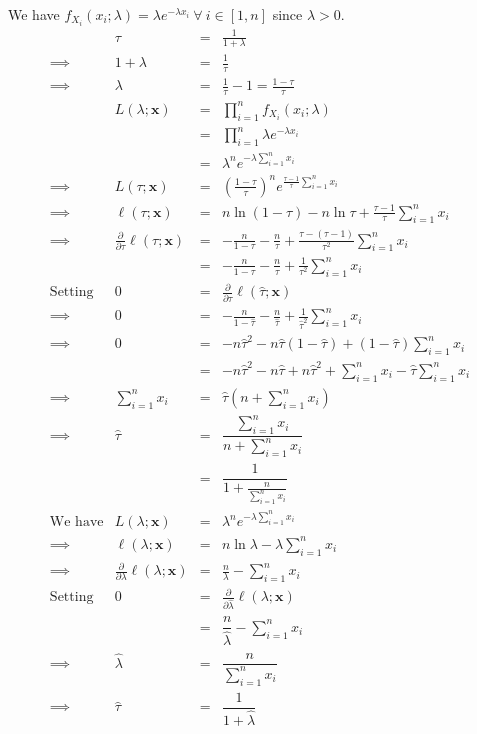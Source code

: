 \documentclass[11pt,a4paper]{article}
\begin{document}
\apart
We have $f_{X_i}(x_i;\lambda)=\lambda e^{-\lambda x_i}\ \forall\ i\in[1,n]$ since $\lambda>0$.
\[\begin{array}{rrcl}
&\tau&=&\frac{1}{1+\lambda}\\
\implies&1+\lambda&=&\frac{1}{\tau}\\
\implies&\lambda&=&\frac{1}{\tau}-1=\frac{1-\tau}{\tau}\\
&L(\lambda;\textbf{x})&=&\prod\limits_{i=1}^nf_{X_i}(x_i;\lambda)\\
&&=&\prod\limits_{i=1}^n\lambda e^{-\lambda x_i}\\
&&=&\lambda^ne^{-\lambda\sum_{i=1}^nx_i}\\
\implies&L(\tau;\textbf{x})&=&\left(\frac{1-\tau}{\tau}\right)^ne^{\frac{\tau-1}{\tau}\sum_{i=1}^nx_i}\\
\implies&\ell(\tau;\textbf{x})&=&n\ln(1-\tau)-n\ln\tau+\frac{\tau-1}{\tau}\sum\limits_{i=1}^nx_i\\
\implies&\frac{\partial}{\partial\tau}\ell(\tau;\textbf{x})&=&-\frac{n}{1-\tau}-\frac{n}{\tau}+\frac{\tau-(\tau-1)}{\tau^2}\sum\limits_{i=1}^nx_i\\
&&=&-\frac{n}{1-\tau}-\frac{n}{\tau}+\frac{1}{\tau^2}\sum\limits_{i=1}^nx_i\\
\text{Setting}&0&=&\frac{\partial}{\partial\tau}\ell(\hat{\tau};\textbf{x})\\
\implies&0&=&-\frac{n}{1-\hat{\tau}}-\frac{n}{\hat{\tau}}+\frac{1}{\hat{\tau}^2}\sum\limits_{i=1}^nx_i\\
\implies&0&=&-n\hat{\tau}^2-n\hat{\tau}(1-\hat{\tau})+(1-\hat{\tau})\sum\limits_{i=1}^nx_i\\
&&=&-n\hat{\tau}^2-n\hat{\tau}+n\hat{\tau}^2+\sum\limits_{i=1}^nx_i-\hat{\tau}\sum\limits_{i=1}^nx_i\\
\implies&\sum\limits_{i=1}^nx_i&=&\hat{\tau}\left(n+\sum\limits_{i=1}^nx_i\right)\\
\implies&\hat{\tau}&=&\dfrac{\sum_{i=1}^nx_i}{n+\sum_{i=1}^nx_i}\\
&&=&\dfrac{1}{1+\frac{n}{\sum_{i=1}^nx_i}}\\
\text{We have}&L(\lambda;\textbf{x})&=&\lambda^ne^{-\lambda\sum_{i=1}^nx_i}\\
\implies&\ell(\lambda;\textbf{x})&=&n\ln\lambda-\lambda\sum\limits_{i=1}^nx_i\\
\implies&\frac{\partial}{\partial\lambda}\ell(\lambda;\textbf{x})&=&\frac{n}{\lambda}-\sum\limits_{i=1}^nx_i\\
\text{Setting}&0&=&\frac{\partial}{\partial\hat{\lambda}}\ell(\lambda;\textbf{x})\\
&&=&\dfrac{n}{\hat{\lambda}}-\sum\limits_{i=1}^nx_i\\
\implies&\hat{\lambda}&=&\dfrac{n}{\sum_{i=1}^nx_i}\\
\implies&\hat{\tau}&=&\dfrac{1}{1+\hat{\lambda}}
\end{array}\]
\end{document}
